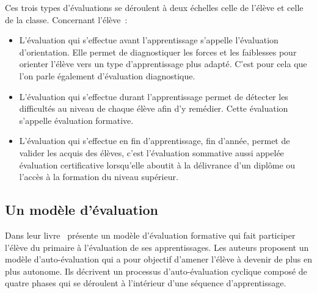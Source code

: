 Ces trois types d'évaluations se déroulent à deux échelles celle de l'élève et celle de la classe.
Concernant l'élève~:
\begin{itemize}
\item L'évaluation qui s'effectue avant l'apprentissage s'appelle l'évaluation d'orientation. Elle permet de diagnostiquer les forces et les faiblesses pour orienter l'élève vers un type d'apprentissage plus adapté. C'est pour cela que l'on parle également d'évaluation diagnostique.
\item L'évaluation qui s'effectue durant l'apprentissage permet de détecter les difficultés au niveau de chaque élève afin d'y remédier. Cette évaluation s'appelle évaluation formative.
\item L'évaluation qui s'effectue en fin d'apprentissage, fin d'année, permet de valider les acquis des élèves, c'est l'évaluation sommative aussi appelée évaluation certificative lorsqu'elle aboutit à la délivrance d'un diplôme ou l'accès à la formation du niveau supérieur.
\end{itemize}

\newpage
\subsection{Un modèle d'évaluation}

Dans leur livre~\cite{doyon_faire_1991} présente un modèle d'évaluation formative qui fait participer l'élève du primaire à l'évaluation de ses apprentissages. 
Les auteurs proposent un modèle d'auto-évaluation qui a pour objectif d'amener l'élève à devenir de plus en plus autonome.
Ils décrivent un processus d'auto-évaluation cyclique composé de quatre phases qui se déroulent à l'intérieur d'une séquence d'apprentissage.

